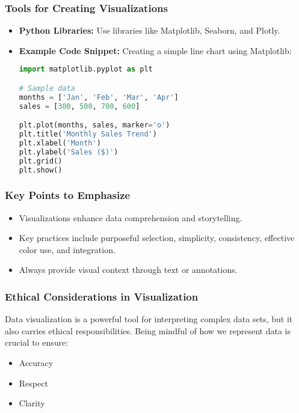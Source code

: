 \documentclass[aspectratio=169]{beamer}
\begin{document}
\begin{frame}[fragile]
    \frametitle{Tools for Creating Visualizations}
    \begin{itemize}
        \item \textbf{Python Libraries:} Use libraries like Matplotlib, Seaborn, and Plotly.
        \item \textbf{Example Code Snippet:} Creating a simple line chart using Matplotlib:
        \begin{lstlisting}[language=Python]
import matplotlib.pyplot as plt

# Sample data
months = ['Jan', 'Feb', 'Mar', 'Apr']
sales = [300, 500, 700, 600]

plt.plot(months, sales, marker='o')
plt.title('Monthly Sales Trend')
plt.xlabel('Month')
plt.ylabel('Sales ($)')
plt.grid()
plt.show()
        \end{lstlisting}
    \end{itemize}
\end{frame}

\begin{frame}[fragile]
    \frametitle{Key Points to Emphasize}
    \begin{itemize}
        \item Visualizations enhance data comprehension and storytelling.
        \item Key practices include purposeful selection, simplicity, consistency, effective color use, and integration.
        \item Always provide visual context through text or annotations.
    \end{itemize}
\end{frame}

\begin{frame}[fragile]
  \frametitle{Ethical Considerations in Visualization}
  Data visualization is a powerful tool for interpreting complex data sets, but it also carries ethical responsibilities. 
  Being mindful of how we represent data is crucial to ensure:
  \begin{itemize}
    \item Accuracy
    \item Respect
    \item Clarity
  \end{itemize}
\end{frame}
\end{document}
